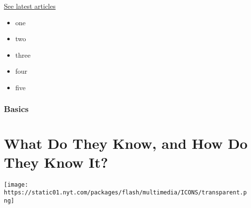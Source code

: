 \href{https://nytimes.com/spotlight/privacy-project-does-privacy-matter}{See
latest articles}

\begin{itemize}
\tightlist
\item
  one
\item
  two
\item
  three
\item
  four
\item
  five
\end{itemize}

\hypertarget{basics-1}{%
\subsubsection{Basics}\label{basics-1}}

\hypertarget{what-do-they-know-and-how-do-they-know-it-1}{%
\section{What Do They Know, and How Do They Know
It?}\label{what-do-they-know-and-how-do-they-know-it-1}}

\texttt{[image: https://static01.nyt.com/packages/flash/multimedia/ICONS/transparent.png]}

